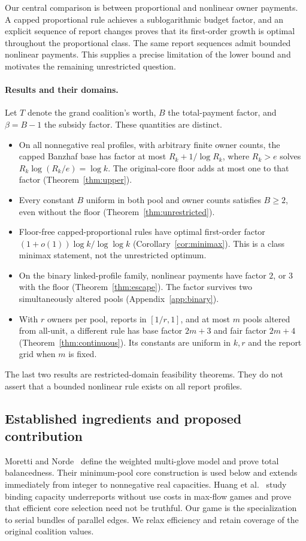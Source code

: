 \documentclass[11pt]{article}
\theoremstyle{definition}\newtheorem{definition}[theorem]{Definition}
\theoremstyle{remark}\newtheorem{remark}[theorem]{Remark}
\begin{document}
Our central comparison is between proportional and nonlinear owner payments.
A capped proportional rule achieves a sublogarithmic budget factor, and an
explicit sequence of report changes proves that its first-order growth is
optimal throughout the proportional class. The same report sequences admit
bounded nonlinear payments. This supplies a precise limitation of the lower
bound and motivates the remaining unrestricted question.

\paragraph{Results and their domains.}
Let $T$ denote the grand coalition's worth, $B$ the total-payment factor, and
$\beta=B-1$ the subsidy factor. These quantities are distinct.
\begin{itemize}
\item On all nonnegative real profiles, with arbitrary finite owner counts,
the capped Banzhaf base has factor at most $R_k+1/\log R_k$, where
$R_k>e$ solves $R_k\log(R_k/e)=\log k$. The original-core floor adds at most
one to that factor (Theorem~\ref{thm:upper}).
\item Every constant $B$ uniform in both pool and owner counts satisfies
$B\ge2$, even without the floor (Theorem~\ref{thm:unrestricted}).
\item Floor-free capped-proportional rules have optimal first-order factor
$(1+o(1))\log k/\log\log k$ (Corollary~\ref{cor:minimax}). This is a class
minimax statement, not the unrestricted optimum.
\item On the binary linked-profile family, nonlinear payments have factor
$2$, or $3$ with the floor (Theorem~\ref{thm:escape}). The factor survives two
simultaneously altered pools (Appendix~\ref{app:binary}).
\item With $r$ owners per pool, reports in $[1/r,1]$, and at most $m$ pools
altered from all-unit, a different rule has base factor $2m+3$ and fair factor
$2m+4$ (Theorem~\ref{thm:continuous}). Its constants are uniform in $k,r$
and the report grid when $m$ is fixed.
\end{itemize}
The last two results are restricted-domain feasibility theorems. They do not
assert that a bounded nonlinear rule exists on all report profiles.

\subsection{Established ingredients and proposed contribution}
Moretti and Norde~\cite{MorettiNorde} define the weighted multi-glove model
and prove total balancedness. Their minimum-pool core construction is used
below and extends immediately from integer to nonnegative real capacities.
Huang et al.~\cite{Huang} study binding capacity underreports without use
costs in max-flow games and prove that efficient core selection need not be
truthful. Our game is the specialization to serial bundles of parallel edges.
We relax efficiency and retain coverage of the original coalition values.
\end{document}
